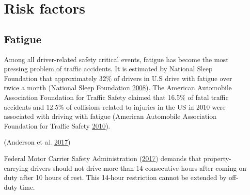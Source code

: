 \documentclass[12pt]{book}
\numberwithin{equation}{chapter}
\begin{document}
\hypertarget{risk-factors}{%
\section{Risk factors}\label{risk-factors}}

\hypertarget{fatigue}{%
\subsection{Fatigue}\label{fatigue}}

Among all driver-related safety critical events, fatigue has become the most pressing problem of traffic accidents. It is estimated by National Sleep Foundation that approximately 32\% of drivers in U.S drive with fatigue over twice a month (National Sleep Foundation \protect\hyperlink{ref-nsleepf}{2008}). The American Automobile Association Foundation for Traffic Safety claimed that 16.5\% of fatal traffic accidents and 12.5\% of collisions related to injuries in the US in 2010 were associated with driving with fatigue (American Automobile Association Foundation for Traffic Safety \protect\hyperlink{ref-aaafoundation}{2010}).

(Anderson et al. \protect\hyperlink{ref-anderson2017exploratory}{2017})

Federal Motor Carrier Safety Administration (\protect\hyperlink{ref-hos2017}{2017}) demands that property-carrying drivers should not drive more than 14 consecutive hours after coming on duty after 10 hours of rest. This 14-hour restriction cannot be extended by off-duty time.
\end{document}
